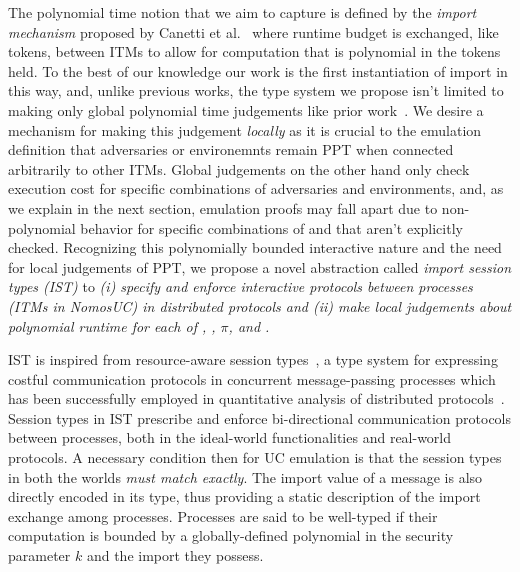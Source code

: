 The polynomial time notion that we aim to capture is defined by the \emph{import mechanism} proposed by Canetti et al.~\cite{uc} where runtime budget is exchanged, like tokens, between ITMs to allow for computation that is polynomial in the tokens held.  
To the best of our knowledge our work is the first instantiation of import in this way, and, unlike previous works, the type system we propose isn't limited to making only global polynomial time judgements like prior work~\cite{ilc, ipdl}.
We desire a mechanism for making this judgement \emph{locally} as it is crucial to the emulation definition that adversaries or environemnts remain PPT when connected arbitrarily to other ITMs. 
Global judgements on the other hand only check execution cost for specific combinations of adversaries and environments, and, as we explain in the next section, emulation proofs may fall apart due to non-polynomial behavior for specific combinations of \Z and \A that aren't explicitly checked. 
Recognizing this polynomially bounded interactive nature and the need for local judgements of PPT, we propose a novel abstraction called \emph{import session types (IST)} to \emph{(i) specify and enforce interactive protocols between processes (ITMs in NomosUC)   in distributed protocols and (ii) make local judgements about polynomial runtime for each of \A, \F, $\pi$, and \Z.} 

IST is inspired from resource-aware session types~\cite{das2018work}, a type system for expressing costful communication protocols
in concurrent message-passing processes which has been successfully employed in quantitative analysis of distributed
protocols~\cite{dasnomos,Das20FSCD,Das22LMCS,Das20arxiv}.
Session types in IST prescribe and enforce bi-directional communication protocols between processes, both in the ideal-world functionalities and real-world protocols.
A necessary condition then for UC emulation is that the session types in both the worlds \emph{must match exactly}.
The import value of a message is also directly encoded in its type, thus providing a static description of the import exchange
among processes.
Processes are said to be well-typed if their computation is bounded by a globally-defined polynomial in the security parameter $k$ and the import they possess.

